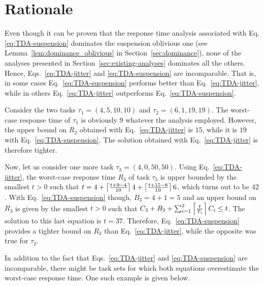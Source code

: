 \section{Rationale}
\label{sec:rationale}

Even though it can be proven that the response time analysis associated with Eq.\eqref{eq:TDA-suspension} dominates the suspension oblivious one (see Lemma~\ref{lem:dominance_oblivious} in Section~\ref{sec:dominance}), none of the analyses presented in Section~\ref{sec:existing-analyses} dominates all the others. Hence, Eqs.~\eqref{eq:TDA-jitter} and \eqref{eq:TDA-suspension} are incomparable. That is, in some cases Eq.~\eqref{eq:TDA-suspension} performs better than Eq.~\eqref{eq:TDA-jitter}, while in others Eq.~\eqref{eq:TDA-jitter} outperforms Eq.~\eqref{eq:TDA-suspension}.

\begin{example} 
\label{ex:rationale_1}  
Consider the two tasks $\tau_1 = (4, 5, 10, 10)$ and $\tau_2 =(6, 1, 19, 19)$. The worst-case response time of $\tau_1$ is obviously $9$ whatever the analysis employed. However, the upper bound on $R_2$ obtained with Eq.~\eqref{eq:TDA-jitter} is $15$, while it is $19$ with Eq.~\eqref{eq:TDA-suspension}. The solution obtained with Eq.~\eqref{eq:TDA-jitter} is therefore tighter.

Now, let us consider one more task $\tau_3 = (4, 0, 50, 50)$. Using Eq.~\eqref{eq:TDA-jitter}, the worst-case response time $R_3$ of task $\tau_3$ is upper bounded by the smallest $t>0$ such that
$t = 4 +\left\lceil{ \frac{t + 9 - 4}{10} }\right\rceil 4 +\left\lceil{ \frac{t + 15 - 6}{19} }\right\rceil 6$, which turns out to be $42$. With Eq.~\eqref{eq:TDA-suspension} though, $B_3 = 4+1 = 5$ and an upper bound on $R_3$ is given by the smallest $t>0$ such that 
$C_3 + B_3 + \sum_{i=1}^{2}\left\lceil{\frac{t}{T_i}}\right\rceil C_i \leq t$. The solution to this last equation is $t=37$. Therefore, Eq.~\eqref{eq:TDA-suspension} provides a tighter bound on $R_3$ than Eq.~\eqref{eq:TDA-jitter}, while the opposite was true for $\tau_2$.
\hfill\myendproof
\end{example}

In addition to the fact that Eqs.~\eqref{eq:TDA-jitter} and \eqref{eq:TDA-suspension} are incomparable, there might be task sets for which both equations overestimate the worst-case response time. One such example is given below.
 
